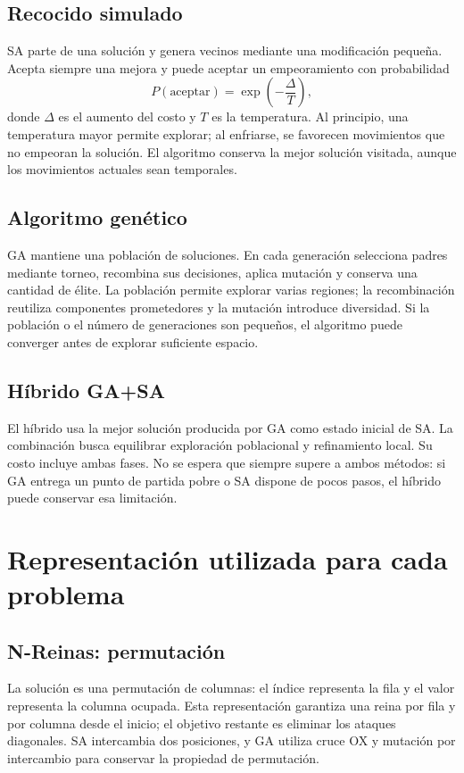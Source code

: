 \documentclass[12pt,letterpaper]{article}
\begin{document}
\subsection{Recocido simulado}

SA parte de una solución y genera vecinos mediante una modificación pequeña.
Acepta siempre una mejora y puede aceptar un empeoramiento con probabilidad
\[
  P(\text{aceptar})=\exp\left(-\frac{\Delta}{T}\right),
\]
donde $\Delta$ es el aumento del costo y $T$ es la temperatura. Al principio,
una temperatura mayor permite explorar; al enfriarse, se favorecen movimientos
que no empeoran la solución. El algoritmo conserva la mejor solución visitada,
aunque los movimientos actuales sean temporales.

\subsection{Algoritmo genético}

GA mantiene una población de soluciones. En cada generación selecciona padres
mediante torneo, recombina sus decisiones, aplica mutación y conserva una
cantidad de élite. La población permite explorar varias regiones; la
recombinación reutiliza componentes prometedores y la mutación introduce
diversidad. Si la población o el número de generaciones son pequeños, el
algoritmo puede converger antes de explorar suficiente espacio.

\subsection{Híbrido GA+SA}

El híbrido usa la mejor solución producida por GA como estado inicial de SA.
La combinación busca equilibrar exploración poblacional y refinamiento local.
Su costo incluye ambas fases. No se espera que siempre supere a ambos métodos:
si GA entrega un punto de partida pobre o SA dispone de pocos pasos, el híbrido
puede conservar esa limitación.

\section{Representación utilizada para cada problema}

\subsection{N-Reinas: permutación}

La solución es una permutación de columnas: el índice representa la fila y el
valor representa la columna ocupada. Esta representación garantiza una reina
por fila y por columna desde el inicio; el objetivo restante es eliminar los
ataques diagonales. SA intercambia dos posiciones, y GA utiliza cruce OX y
mutación por intercambio para conservar la propiedad de permutación.
\end{document}
